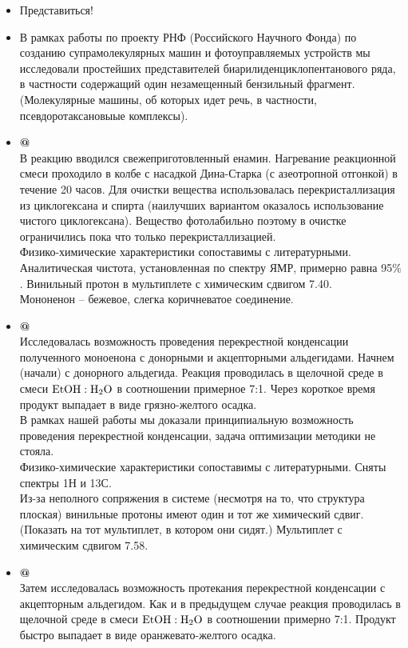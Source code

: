 \documentclass[a4paper]{article}
\makeatletter
\newcommand*{\rom}[1]{\expandafter\@slowromancap\romannumeral #1@}
\makeatother
\begin{document}
\begin{itemize}
\item Представиться!
\item В рамках работы по проекту РНФ (Российского Научного Фонда) по созданию супрамолекулярных машин и фотоуправляемых устройств мы исследовали простейших представителей биарилиденциклопентанового ряда, в частности содержащий один незамещенный бензильный фрагмент. 
(Молекулярные машины, об которых идет речь, в частности, псевдоротаксановыые комплексы).
\item \textbf{\rom{1}} \\
В реакцию вводился свежеприготовленный енамин. Нагревание реакционной смеси проходило в колбе с насадкой Дина-Старка (с азеотропной отгонкой) в течение 20 часов. Для очистки вещества использовалась перекристаллизация из циклогексана и спирта (наилучших вариантом оказалось использование чистого циклогексана). Вещество фотолабильно поэтому в очистке ограничились пока что только перекристаллизацией. \\
Физико-химические характеристики сопоставимы с литературными. Аналитическая чистота, установленная по спектру ЯМР, примерно равна 95$\%$. 
Винильный протон в мультиплете с химическим сдвигом 7.40. \\
Мононенон -- бежевое, слегка коричневатое соединение.
\item \textbf{\rom{2}} \\
Исследовалась возможность проведения перекрестной конденсации полученного моноенона с донорными и акцепторными альдегидами. Начнем (начали) с донорного альдегида. Реакция проводилась в щелочной среде в смеси $\ce{EtOH} : \ce{H2O}$ в соотношении примерное 7:1. Через короткое время продукт выпадает в виде грязно-желтого осадка. \\ 
В рамках нашей работы мы доказали принципиальную возможность проведения перекрестной конденсации, задача оптимизации методики не стояла. \\
Физико-химические характеристики сопоставимы с литературными. Сняты спектры 1Н и 13С. \\
Из-за неполного сопряжения в системе (несмотря на то, что структура плоская) винильные протоны имеют один и тот же химический сдвиг. (Показать на тот мультиплет, в котором они сидят.) Мультиплет с химическим сдвигом 7.58.
\item \textbf{\rom{3}} \\
Затем исследовалась возможность протекания перекрестной конденсации с акцепторным альдегидом. Как и в предыдущем случае реакция проводилась в щелочной среде в смеси $\ce{EtOH} : \ce{H2O}$ в соотношении примерно 7:1. Продукт быстро выпадает в виде оранжевато-желтого осадка. \\

\end{itemize}
\end{document}
